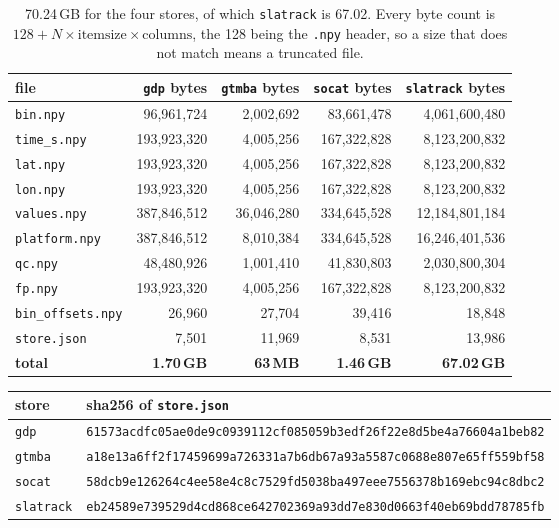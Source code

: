 \documentclass[10pt]{article}
\newcommand{\code}[1]{\texttt{#1}}
\begin{document}
\begin{table}[h]
\centering\setlength{\tabcolsep}{4pt}\footnotesize
\begin{tabular}{@{}lrrrr@{}}
\toprule
file & \code{gdp} bytes & \code{gtmba} bytes & \code{socat} bytes & \code{slatrack} bytes \\
\midrule
\code{bin.npy}          & 96,961,724  & 2,002,692  & 83,661,478  & 4,061,600,480 \\
\code{time\_s.npy}      & 193,923,320 & 4,005,256  & 167,322,828 & 8,123,200,832 \\
\code{lat.npy}          & 193,923,320 & 4,005,256  & 167,322,828 & 8,123,200,832 \\
\code{lon.npy}          & 193,923,320 & 4,005,256  & 167,322,828 & 8,123,200,832 \\
\code{values.npy}       & 387,846,512 & 36,046,280 & 334,645,528 & 12,184,801,184 \\
\code{platform.npy}     & 387,846,512 & 8,010,384  & 334,645,528 & 16,246,401,536 \\
\code{qc.npy}           & 48,480,926  & 1,001,410  & 41,830,803  & 2,030,800,304 \\
\code{fp.npy}           & 193,923,320 & 4,005,256  & 167,322,828 & 8,123,200,832 \\
\code{bin\_offsets.npy} & 26,960      & 27,704     & 39,416      & 18,848 \\
\code{store.json}       & 7,501       & 11,969     & 8,531       & 13,986 \\
\midrule
\textbf{total}          & \textbf{1.70\,GB} & \textbf{63\,MB} & \textbf{1.46\,GB} & \textbf{67.02\,GB} \\
\bottomrule
\end{tabular}
\caption{70.24\,GB for the four stores, of which \code{slatrack} is 67.02.
Every byte count is
$128 + N \times \text{itemsize} \times \text{columns}$, the 128 being the
\code{.npy} header, so a size that does not match means a truncated file.}
\end{table}

\begin{table}[h]
\centering\setlength{\tabcolsep}{4pt}\footnotesize
\begin{tabular}{@{}ll@{}}
\toprule
store & sha256 of \code{store.json} \\
\midrule
\code{gdp}      & \code{61573acdfc05ae0de9c0939112cf0850}\allowbreak\code{59b3edf26f22e8d5be4a76604a1beb82} \\
\code{gtmba}    & \code{a18e13a6ff2f17459699a726331a7b6d}\allowbreak\code{b67a93a5587c0688e807e65ff559bf58} \\
\code{socat}    & \code{58dcb9e126264c4ee58e4c8c7529fd50}\allowbreak\code{38ba497eee7556378b169ebc94c8dbc2} \\
\code{slatrack} & \code{eb24589e739529d4cd868ce642702369}\allowbreak\code{a93dd7e830d0663f40eb69bdd78785fb} \\
\bottomrule
\end{tabular}
\end{table}
\end{document}
